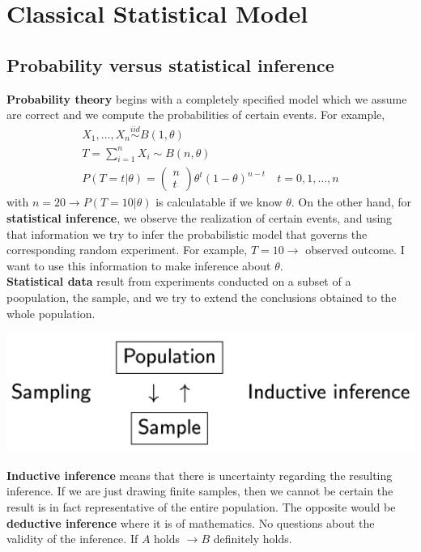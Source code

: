 \chapter{Classical Statistical Model}

\section{Probability versus statistical inference}

\textbf{Probability theory} begins with a completely specified model which we assume are correct and we compute the probabilities of certain events. 
For example, 
\begin{gather*}
    X_1,\ldots,X_n \overset{iid}{\sim} B(1,\theta)\\
    T = \sum_{i=1}^{n}X_i\sim B(n,\theta)\\
    P(T=t|\theta) = \left( \begin{array}{c} n \\ t \end{array} \right)\theta^t(1-\theta)^{n-t} \quad t=0,1,\ldots,n
\end{gather*}
with $n=20 \to P(T=10|\theta)$ is calculatable if we know $\theta$.
On the other hand, for \textbf{statistical inference}, we observe the realization of certain events,
and using that information we try to infer the probabilistic model that governs the corresponding random experiment. 
For example, $T=10\to$ observed outcome. I want to use this information to make inference about $\theta$.\\

\textbf{Statistical data} result from experiments conducted on a subset of a poopulation, the sample,
and we try to extend the conclusions obtained to the whole population.
\begin{center}
    \includegraphics[scale=0.2]{Images/3.png}
\end{center}
\textbf{Inductive inference} means that there is uncertainty regarding the resulting inference.
If we are just drawing finite samples, then we cannot be certain the result is in fact representative of the entire population.
The opposite would be \textbf{deductive inference} where it is of mathematics. No questions about the validity of the inference.
If $A$ holds $\to B$ definitely holds.


